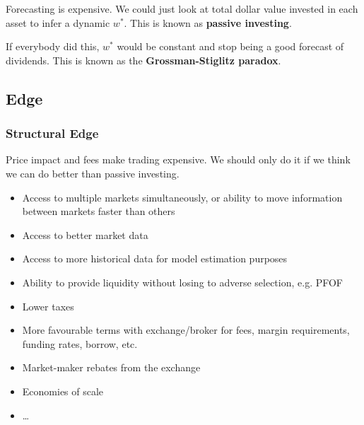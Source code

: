 \documentclass{article}
\begin{document}
Forecasting is expensive. We could just look at total dollar value invested in each asset to infer a dynamic $w^*$. This is known as \textbf{passive investing}.

If everybody did this, $w^*$ would be constant and stop being a good forecast of dividends. This is known as the \textbf{Grossman-Stiglitz paradox}.

\subsection{Edge}
\subsubsection{Structural Edge}
Price impact and fees make trading expensive. We should only do it if we think we can do better than passive investing.

\begin{itemize}
	\item Access to multiple markets simultaneously, or ability to move information between markets faster than others%
	\item Access to better market data
	\item Access to more historical data for model estimation purposes
	\item Ability to provide liquidity without losing to adverse selection, e.g. PFOF
	\item Lower taxes
	\item More favourable terms with exchange/broker for fees, margin requirements, funding rates, borrow, etc.
	\item Market-maker rebates from the exchange
	\item Economies of scale
	\item \ldots
\end{itemize}
\end{document}

